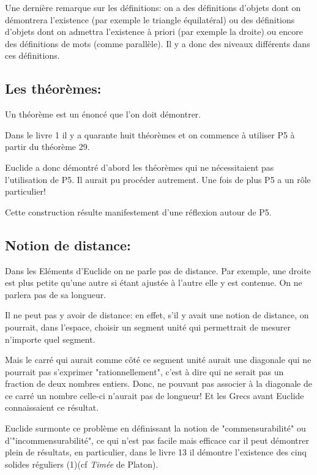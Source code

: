 \documentclass[a4paper, 12pt, twoside]{book}
\begin{document}
Une dernière remarque sur les définitions:
 on a des définitions d'objets dont on démontrera l'existence (par exemple le triangle équilatéral) ou des définitions d'objets dont on admettra l'existence à priori (par exemple la droite) ou encore des définitions de mots (comme parallèle). Il y a donc des niveaux différents dans ces définitions. 
 
 \subsection{Les théorèmes:}
 
 Un théorème est un énoncé que l'on doit démontrer.\
 
 
 Dans le livre 1 il y a quarante huit théorèmes et on commence à utiliser P5 à partir du théorème 29.

  Euclide a donc démontré d'abord les théorèmes qui ne nécessitaient pas l'utilisation de P5. Il aurait pu procéder autrement. Une fois de plus P5 a un rôle particulier! 
    
  Cette construction résulte manifestement  d'une réflexion autour de P5.
  
  \subsection{Notion de distance:}
  
  Dans les Eléments d'Euclide on ne parle pas de distance. Par exemple, une droite est plus petite qu'une autre si étant ajustée à l'autre elle y est contenue. On ne parlera pas de sa longueur.\
  
  Il ne peut pas y avoir de distance: en effet, s'il y avait une notion de distance, on pourrait, dans l'espace, choisir un segment unité qui permettrait de mesurer n'importe quel segment.\
  
   Mais le carré qui aurait comme côté ce segment unité aurait une diagonale qui  ne pourrait pas s'exprimer "rationnellement", c'est à dire qui ne serait pas un fraction de deux nombres entiers. Donc, ne pouvant pas associer à la diagonale de ce carré un nombre celle-ci n'aurait pas de longueur! Et les Grecs avant Euclide connaissaient ce résultat.\
  
  Euclide surmonte ce problème en définissant la notion de "commensurabilité" ou d'"incommensurabilité", ce qui n'est pas facile mais efficace car il peut démontrer plein de résultats, en particulier, dans le livre 13 il démontre l'existence des cinq solides réguliers (1)(cf \textit{Timée} de Platon).\\
  
\end{document}
